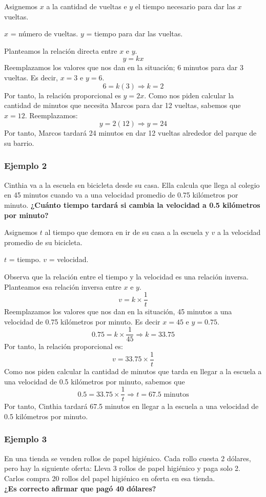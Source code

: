 \documentclass[11pt]{book}
\begin{document}
Asignemos $x$ a la cantidad de vueltas e $y$ el tiempo necesario para dar las $x$ vueltas.

\begin{center}
  $x$ = n\'umero de vueltas. \quad $y$ = tiempo para dar las vueltas.
\end{center}
Planteamos la relación directa entre $x$ e $y$.
\[y=kx\]
Reemplazamos los valores que nos dan en la situación; 6 minutos para dar 3 vueltas. Es decir, $x=3$ e $y=6$.
\[6=k(3) \Rightarrow k=2\]
Por tanto, la relación proporcional es $y=2x$.
Como nos piden calcular la cantidad de minutos que necesita Marcos para dar 12 vueltas, sabemos que $x=12$.
Reemplazamos:
\[y=2(12) \Rightarrow y=24\]
Por tanto, Marcos tardará 24 minutos en dar 12 vueltas alrededor del parque de su barrio.
\subsubsection{Ejemplo 2}
Cinthia va a la escuela en bicicleta desde su casa. Ella calcula que llega al colegio en 45 minutos cuando va a una velocidad promedio de 0.75 kilómetros por minuto.
\textbf{¿Cuánto tiempo tardará si cambia la velocidad a 0.5 kilómetros por minuto?}

Asignemos $t$ al tiempo que demora en ir de su casa a la escuela y $v$ a la velocidad promedio de su bicicleta.
\begin{center}
  $t$ = tiempo. \quad $v$ = velocidad.
\end{center}
Observa que la relación entre el tiempo y la velocidad es una relación inversa. Planteamos esa relación inversa entre $x$ e $y$.
\[v=k \times \frac{1}{t}\]
Reemplazamos los valores que nos dan en la situación, 45 minutos a una velocidad de 0.75 kilómetros por minuto. Es decir $x=45$ e $y=0.75$.
\[0.75=k\times \frac{1}{45} \Rightarrow k=33.75\]
Por tanto, la relación proporcional es:
\[v=33.75 \times \frac{1}{t}\]
Como nos piden calcular la cantidad de minutos que tarda en llegar a la escuela a una velocidad de 0.5 kilómetros por minuto, sabemos que \[0.5=33.75 \times \frac{1}{t} \Rightarrow t=67.5 \text{ minutos}\]
Por tanto, Cinthia tardará 67.5 minutos en llegar a la escuela a una velocidad de 0.5 kilómetros por minuto.

\subsubsection{Ejemplo 3}

En una tienda se venden rollos de papel higiénico. Cada rollo cuesta 2 dólares, pero hay la siguiente oferta:
Lleva 3 rollos de papel higiénico y paga solo 2.
Carlos compra 20 rollos del papel higiénico en oferta en esa tienda.\\
\textbf{¿Es correcto afirmar que pagó 40 dólares?}\\
\end{document}
